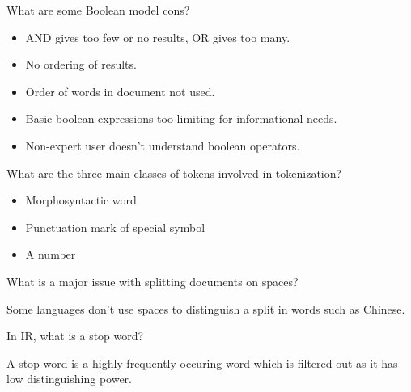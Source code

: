 \documentclass[2by4,grid]{flashcards}
\begin{document}
\begin{flashcard}{What are some Boolean model cons?}
	\begin{center}
        \begin{itemize}
            \item AND gives too few or no results, OR gives too many.
            \item No ordering of results.
            \item Order of words in document not used.
            \item Basic boolean expressions too limiting for informational needs.
            \item Non-expert user doesn't understand boolean operators.
        \end{itemize}
	\end{center}
\end{flashcard}

\begin{flashcard}{What are the three main classes of tokens involved in tokenization?}
	\begin{center}
        \begin{itemize}
            \item Morphosyntactic word
            \item Punctuation mark of special symbol
            \item A number
        \end{itemize}
	\end{center}
\end{flashcard}

\begin{flashcard}{What is a major issue with splitting documents on spaces?}
	\begin{center}
        Some languages don't use spaces to distinguish a split in words such as Chinese.
	\end{center}
\end{flashcard}

\begin{flashcard}{In IR, what is a stop word?}
	\begin{center}
        A stop word is a highly frequently occuring word which is filtered out as it has low distinguishing power.
	\end{center}
\end{flashcard}
\end{document}
